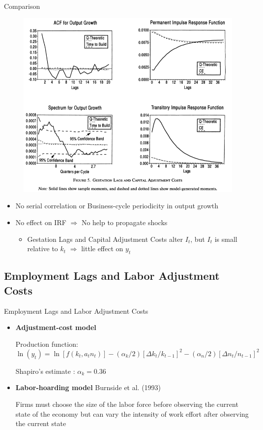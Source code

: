 \documentclass[10pt]{beamer}
\begin{document}
\begin{frame}{Comparison}
    \begin{figure}
        \centering
        \includegraphics[width=0.65\linewidth]{figures/Capital_adj_cost.png}
    \end{figure}
    \small
    \begin{itemize}
        \item No serial correlation or Business-cycle periodicity in output growth
        \item No effect on IRF $\Rightarrow$ No help to propagate shocks
              \begin{itemize}
                  \item Gestation Lags and Capital Adjustment Costs alter $I_t$, but $I_t$ is small
                        relative to $k_t$ $\Rightarrow$ little effect on $y_t$
              \end{itemize}
    \end{itemize}

\end{frame}

\subsection{Employment Lags and Labor Adjustment Costs}
\begin{frame}{Employment Lags and Labor Adjustment Costs}
    \begin{itemize}
        \item \textbf{Adjustment-cost model}

              Production function: $$ \ln \left(y_t\right)= \ln \left[f\left(k_t, a_t
                      n_t\right)\right] -\left(\alpha_{k} / 2\right)\left[\Delta k_t /
                      k_{t-1}\right]^2 -\left(\alpha_n / 2\right)\left[\Delta n_t / n_{t-1}\right]^2
              $$

              Shapiro's estimate : $\alpha_{k} = 0.36$

        \item \textbf{Labor-hoarding model} Burnside et al. (1993)

              Firms must choose the size of the labor force before observing the current
              state of the economy but can vary the intensity of work effort after observing
              the current state
    \end{itemize}

\end{frame}
\end{document}

